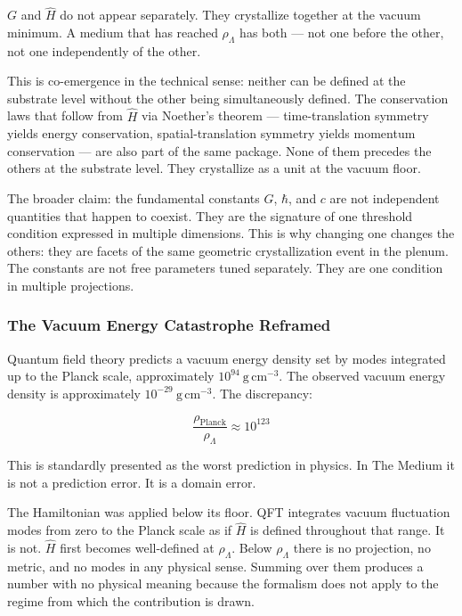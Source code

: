 \documentclass[11pt,letterpaper]{article}
\begin{document}
\(G\) and \(\hat{H}\) do not appear separately. They crystallize together at the vacuum minimum. A medium that has reached \(\rho_\Lambda\) has both --- not one before the other, not one independently of the other.

This is co-emergence in the technical sense: neither can be defined at the substrate level without the other being simultaneously defined. The conservation laws that follow from \(\hat{H}\) via Noether's theorem --- time-translation symmetry yields energy conservation, spatial-translation symmetry yields momentum conservation --- are also part of the same package. None of them precedes the others at the substrate level. They crystallize as a unit at the vacuum floor.

The broader claim: the fundamental constants \(G\), \(\hbar\), and \(c\) are not independent quantities that happen to coexist. They are the signature of one threshold condition expressed in multiple dimensions. This is why changing one changes the others: they are facets of the same geometric crystallization event in the plenum. The constants are not free parameters tuned separately. They are one condition in multiple projections.

\subsubsection{The Vacuum Energy Catastrophe Reframed}
\label{sec:orgff8df16}

Quantum field theory predicts a vacuum energy density set by modes integrated up to the Planck scale, approximately \(10^{94}\ \mathrm{g\,cm^{-3}}\). The observed vacuum energy density is approximately \(10^{-29}\ \mathrm{g\,cm^{-3}}\). The discrepancy:

\begin{equation}
\frac{\rho_{\mathrm{Planck}}}{\rho_\Lambda} \approx 10^{123}
\end{equation}

This is standardly presented as the worst prediction in physics. In The Medium it is not a prediction error. It is a domain error.

The Hamiltonian was applied below its floor. QFT integrates vacuum fluctuation modes from zero to the Planck scale as if \(\hat{H}\) is defined throughout that range. It is not. \(\hat{H}\) first becomes well-defined at \(\rho_\Lambda\). Below \(\rho_\Lambda\) there is no projection, no metric, and no modes in any physical sense. Summing over them produces a number with no physical meaning because the formalism does not apply to the regime from which the contribution is drawn.
\end{document}
